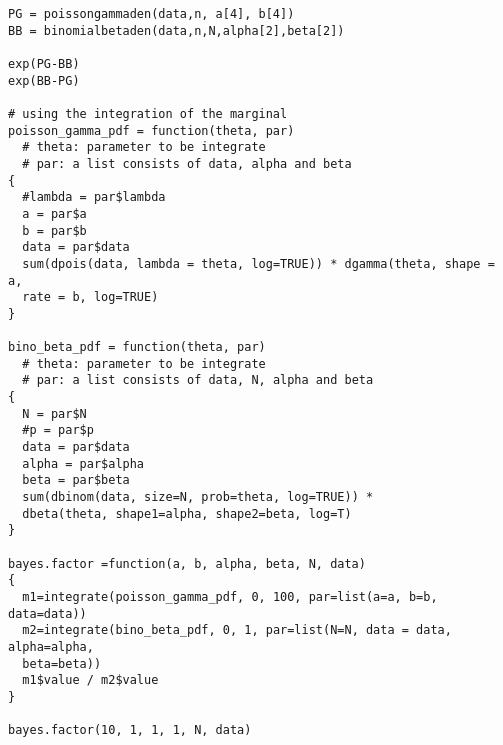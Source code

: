 \documentclass[a4paper, 11pt]{article}
\begin{document}
\begin{verbatim}
PG = poissongammaden(data,n, a[4], b[4])
BB = binomialbetaden(data,n,N,alpha[2],beta[2])

exp(PG-BB)
exp(BB-PG)

# using the integration of the marginal
poisson_gamma_pdf = function(theta, par)
  # theta: parameter to be integrate
  # par: a list consists of data, alpha and beta
{
  #lambda = par$lambda
  a = par$a
  b = par$b
  data = par$data
  sum(dpois(data, lambda = theta, log=TRUE)) * dgamma(theta, shape = a, 
  rate = b, log=TRUE)
}

bino_beta_pdf = function(theta, par)
  # theta: parameter to be integrate
  # par: a list consists of data, N, alpha and beta
{
  N = par$N
  #p = par$p
  data = par$data
  alpha = par$alpha
  beta = par$beta
  sum(dbinom(data, size=N, prob=theta, log=TRUE)) * 
  dbeta(theta, shape1=alpha, shape2=beta, log=T)
}

bayes.factor =function(a, b, alpha, beta, N, data)
{
  m1=integrate(poisson_gamma_pdf, 0, 100, par=list(a=a, b=b, data=data))
  m2=integrate(bino_beta_pdf, 0, 1, par=list(N=N, data = data, alpha=alpha,
  beta=beta))
  m1$value / m2$value
}

bayes.factor(10, 1, 1, 1, N, data)
\end{verbatim}
\end{document}

